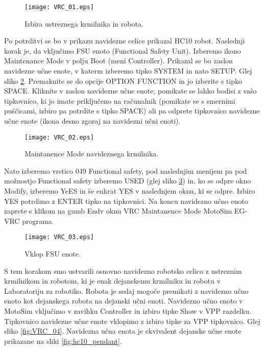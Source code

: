 \begin{figure}[hbt]
	\centering
	\texttt{[image: VRC\_01.eps]}
	\caption{Izbira ustreznega krmilnika in robota.}
	\label{fig:VRC_01}
\end{figure}

Po potrditvi se bo v prikazu navidezne celice prikazal HC10 robot. Naslednji korak je, da vključimo FSU enoto (Functional Safety Unit). Izberemo ikono Maintenance Mode v polju Boot (meni Controller). Prikazal se bo zaslon navidezne učne enote, v katerm izberemo tipko SYSTEM in nato SETUP. Glej sliko \ref{fig:VRC_02}. Premaknite se do opcije OPTION FUNCTION in jo izberite s tipko SPACE. Kliknite v zaslon navidezne učne enote, pomikate se lahko bodisi z vašo tipkovnico, ki jo imate priključeno na računalnik (pomikate se s smernimi puščicami, izbiro pa potrdite s tipko SPACE) ali pa odprete tipkovnico navidezne učne enote (ikona desno zgoraj na navidezni učni enoti).

\begin{figure}[hbt]
	\centering
	\texttt{[image: VRC\_02.eps]}
	\caption{Maintanence Mode navideznega krmilnika.}
	\label{fig:VRC_02}
\end{figure}

Nato izberemo vrstico 049 Functional safety, pod naslednjim menijem pa pod možnostjo Functional safety izberemo USED (glej sliko \ref{fig:VRC_03}) in, ko se odpre okno Modify, izberemo YeES in še enkrat YES v naslednjem oknu, ki se odpre. Izbiro YES potrdimo z ENTER tipko na tipkovnici. Na koncu navidezno učno enoto zaprete s klikom na gumb Endv oknu VRC Maintanence Mode MotoSim EG-VRC programa.

\begin{figure}[hbt]
	\centering
	\texttt{[image: VRC\_03.eps]}
	\caption{Vklop FSU enote.}
	\label{fig:VRC_03}
\end{figure}

S tem korakom smo ustvarili osnovno navidezno robotsko celico z ustreznim krmilnikom in robotom, ki je enak dejanskemu krmilniku in robotu v Laboratoriju za robotiko. Robota je sedaj mogoče premikati z navidezno učno enoto kot dejanskega robota na dejanski učni enoti. Navidezno učno enoto v MotoSim vključimo v zavihku Controller in izbiro tipke Show v VPP razdelku. Tipkovnico navidezne učne enote vklopimo z izbiro tipke za VPP tipkovnico. Glej sliko \ref{fig:VRC_04}. Navidezna učna enota je ekvivalent dejanske učne enote prikazane na sliki \ref{fig:hc10_pendant}.

